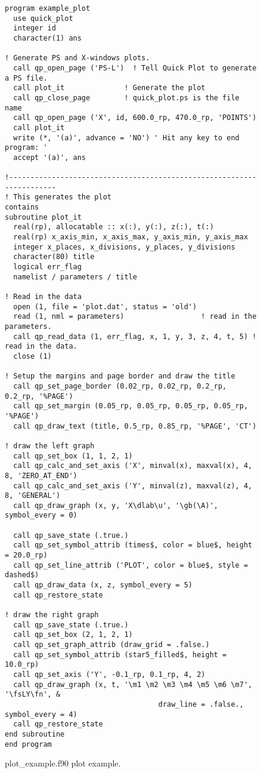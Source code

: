 \begin{figure}
\footnotesize
\begin{verbatim}
program example_plot
  use quick_plot
  integer id
  character(1) ans

! Generate PS and X-windows plots.
  call qp_open_page ('PS-L')  ! Tell Quick Plot to generate a PS file.
  call plot_it              ! Generate the plot
  call qp_close_page        ! quick_plot.ps is the file name
  call qp_open_page ('X', id, 600.0_rp, 470.0_rp, 'POINTS')
  call plot_it
  write (*, '(a)', advance = 'NO') ' Hit any key to end program: '
  accept '(a)', ans

!----------------------------------------------------------------------
! This generates the plot
contains
subroutine plot_it
  real(rp), allocatable :: x(:), y(:), z(:), t(:)
  real(rp) x_axis_min, x_axis_max, y_axis_min, y_axis_max
  integer x_places, x_divisions, y_places, y_divisions
  character(80) title
  logical err_flag
  namelist / parameters / title

! Read in the data
  open (1, file = 'plot.dat', status = 'old')
  read (1, nml = parameters)                  ! read in the parameters.
  call qp_read_data (1, err_flag, x, 1, y, 3, z, 4, t, 5) ! read in the data.
  close (1)

! Setup the margins and page border and draw the title
  call qp_set_page_border (0.02_rp, 0.02_rp, 0.2_rp, 0.2_rp, '%PAGE')
  call qp_set_margin (0.05_rp, 0.05_rp, 0.05_rp, 0.05_rp, '%PAGE')
  call qp_draw_text (title, 0.5_rp, 0.85_rp, '%PAGE', 'CT') 

! draw the left graph
  call qp_set_box (1, 1, 2, 1)
  call qp_calc_and_set_axis ('X', minval(x), maxval(x), 4, 8, 'ZERO_AT_END')
  call qp_calc_and_set_axis ('Y', minval(z), maxval(z), 4, 8, 'GENERAL')
  call qp_draw_graph (x, y, 'X\dlab\u', '\gb(\A)', symbol_every = 0)

  call qp_save_state (.true.)
  call qp_set_symbol_attrib (times$, color = blue$, height = 20.0_rp)
  call qp_set_line_attrib ('PLOT', color = blue$, style = dashed$)
  call qp_draw_data (x, z, symbol_every = 5)
  call qp_restore_state

! draw the right graph
  call qp_save_state (.true.)
  call qp_set_box (2, 1, 2, 1)
  call qp_set_graph_attrib (draw_grid = .false.)
  call qp_set_symbol_attrib (star5_filled$, height = 10.0_rp)
  call qp_set_axis ('Y', -0.1_rp, 0.1_rp, 4, 2)
  call qp_draw_graph (x, t, '\m1 \m2 \m3 \m4 \m5 \m6 \m7', '\fsLY\fn', &
                                    draw_line = .false., symbol_every = 4)
  call qp_restore_state
end subroutine
end program
\end{verbatim}
\caption{plot\_example.f90 plot example.}
\label{f:plot_example}
\end{figure}


